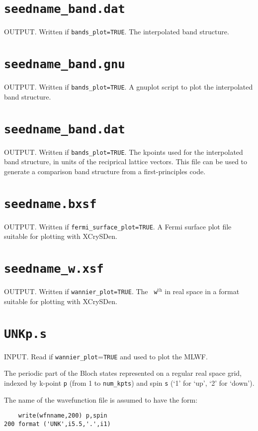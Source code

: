 \section{{\tt seedname\_band.dat}}
OUTPUT. Written if {\tt bands\_plot=TRUE}. The interpolated band structure.

\section{{\tt seedname\_band.gnu}}
OUTPUT. Written if {\tt bands\_plot=TRUE}. A gnuplot script to plot the interpolated band structure.

\section{{\tt seedname\_band.dat}}
OUTPUT. Written if {\tt bands\_plot=TRUE}. The kpoints used for the interpolated band structure, in units
of the reciprical lattice vectors. This file can be used to generate
a comparison band structure from a first-principles code.

\section{{\tt seedname.bxsf}}
OUTPUT. Written if {\tt fermi\_surface\_plot=TRUE}. A Fermi surface plot file
suitable for plotting with XCrySDen.

\section{{\tt seedname\_w.xsf}}
OUTPUT. Written if {\tt wannier\_plot=TRUE}. The {\tt
  w}$^{\mathrm{th}}$ in real space in a format suitable for plotting
  with XCrySDen. 


\section{{\tt UNKp.s}}
INPUT. Read if \verb#wannier_plot#=\verb#TRUE# and used to plot the
MLWF.

The periodic part of the Bloch states represented on a regular real
 space grid, indexed by k-point \verb#p# (from 1 to \verb#num_kpts#)
 and spin \verb#s# (`1' for `up', `2' for `down').

The name of the wavefunction file is assumed to have the form:

\begin{verbatim}
    write(wfnname,200) p,spin
200 format ('UNK',i5.5,'.',i1)
\end{verbatim}


